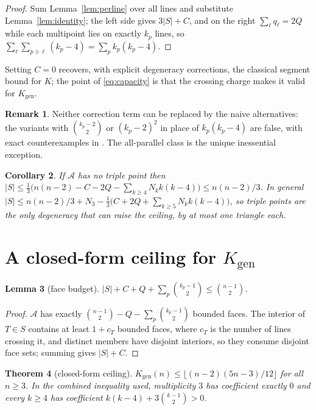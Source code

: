 \documentclass[11pt]{article}
\newtheorem{theorem}{Theorem}
\newtheorem{lemma}[theorem]{Lemma}
\newtheorem{corollary}[theorem]{Corollary}
\theoremstyle{definition}
\newtheorem{remark}[theorem]{Remark}
\newcommand{\Kgen}{K_{\mathrm{gen}}}
\newcommand{\Nk}{N_k}
\begin{document}
\begin{proof}
Sum Lemma~\ref{lem:perline} over all lines and substitute
Lemma~\ref{lem:identity}; the left side gives $3|S|+C$, and on the right
$\sum_\ell q_\ell=2Q$ while each multipoint lies on exactly $k_p$ lines, so
$\sum_\ell\sum_{p\ni\ell}(k_p-4)=\sum_p k_p(k_p-4)$.
\end{proof}

Setting $C=0$ recovers, with explicit degeneracy corrections, the classical
segment bound for $K$; the point of \eqref{eq:capacity} is that the crossing
charge makes it valid for $\Kgen$.

\begin{remark}
Neither correction term can be replaced by the naive alternatives: the
variants with $\binom{k_p-2}{2}$ or $(k_p-2)^2$ in place of $k_p(k_p-4)$ are
false, with exact counterexamples in \cite[\S6]{companion}. The all-parallel
class is the unique inessential exception.
\end{remark}

\begin{corollary}\label{cor:tamura}
If $\mathcal A$ has no triple point then
$|S|\le\frac13\big(n(n-2)-C-2Q-\sum_{k\ge4}\Nk k(k-4)\big)\le n(n-2)/3$. In
general
$|S|\le n(n-2)/3+N_3-\frac13\big(C+2Q+\sum_{k\ge5}\Nk k(k-4)\big)$, so triple
points are the only degeneracy that can raise the ceiling, by at most one
triangle each.
\end{corollary}

\section{A closed-form ceiling for $\Kgen$}

\begin{lemma}[face budget]\label{lem:face}
$|S|+C+Q+\sum_p\binom{k_p-1}{2}\le\binom{n-1}{2}$.
\end{lemma}

\begin{proof}
$\mathcal A$ has exactly $\binom{n-1}{2}-Q-\sum_p\binom{k_p-1}{2}$ bounded
faces. The interior of $T\in S$ contains at least $1+c_T$ bounded faces,
where $c_T$ is the number of lines crossing it, and distinct members have
disjoint interiors, so they consume disjoint face sets; summing gives
$|S|+C$.
\end{proof}

\begin{theorem}[closed-form ceiling]\label{thm:ceiling}
$\Kgen(n)\le\big\lfloor (n-2)(5n-3)/12\big\rfloor$ for all $n\ge3$. In the
combined inequality used, multiplicity $3$ has coefficient exactly $0$ and
every $k\ge4$ has coefficient $k(k-4)+3\binom{k-1}{2}>0$.
\end{theorem}
\end{document}
